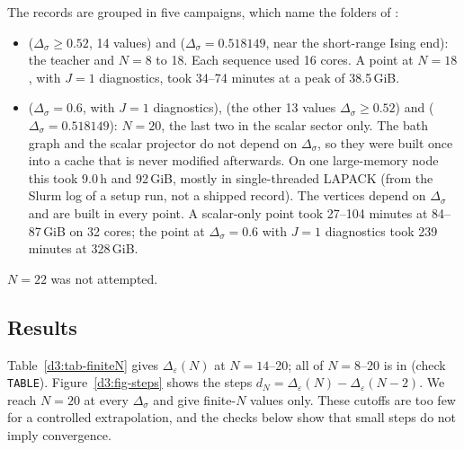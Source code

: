 The records are grouped in five campaigns, which name the folders of :
\begin{itemize}
\item {} ($\Delta_\sigma\geq0.52$, 14 values) and  ($\Delta_\sigma=0.518149$, near the
 short-range Ising end): the teacher and $N=8$ to 18. Each sequence used 16 cores. A point at $N=18$, with $J=1$
 diagnostics, took 34--74 minutes at a peak of 38.5\,GiB. %
\item {} ($\Delta_\sigma=0.6$, with $J=1$ diagnostics),  (the other 13 values
 $\Delta_\sigma\geq0.52$) and  ($\Delta_\sigma=0.518149$): $N=20$, the last two in the scalar sector
 only. The bath graph and the scalar projector do not depend on $\Delta_\sigma$, so they were built once into a cache
 that is never modified afterwards. On one large-memory node this took 9.0\,h and 92\,GiB, mostly in single-threaded
 LAPACK (from the Slurm log of a setup run, not a shipped record). The vertices depend on $\Delta_\sigma$ and are
 built in every point. A scalar-only point took 27--104 minutes at 84--87\,GiB on 32 cores; the point at
 $\Delta_\sigma=0.6$ with $J=1$ diagnostics took 239 minutes at 328\,GiB. %
\end{itemize}

$N=22$ was not attempted.

\subsection{Results}\label{d3:results}

Table~\ref{d3:tab-finiteN} gives $\Delta_\varepsilon(N)$ at $N=14$--20; all of $N=8$--20 is in
 (check \texttt{TABLE}). Figure~\ref{d3:fig-steps} shows the steps
$d_N=\Delta_\varepsilon(N)-\Delta_\varepsilon(N-2)$. We reach $N=20$ at every $\Delta_\sigma$ %
and give finite-$N$ values only. These cutoffs are too few for a controlled extrapolation, and the checks below
show that small steps do not imply convergence.

\begin{table}[h]
\centering
\footnotesize

\caption{$\Delta_\varepsilon$ from the $d=3$ window truncation at bath cutoffs $N=14$--20, with the last step
$d_{20}=\Delta_\varepsilon(20)-\Delta_\varepsilon(18)$ and its ratio to the previous one. Finite-cutoff values, not
limits.}
\label{d3:tab-finiteN}
\end{table}

